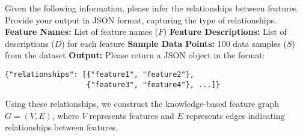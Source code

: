 \begin{tcolorbox}[
    sharp corners=south,
    colback=white!98!black,
    colframe=white!45!black,
    boxrule=0.5mm,
    width=0.48\textwidth,
    enlarge left by=0mm,
    enlarge right by=0mm,
    arc=5mm,
    outer arc=3mm,
    fonttitle=\bfseries,
    title=Prompt for Feature Relationship Inference,
    before upper=\par\small,
    after upper=\par\small
]
\vspace*{-0.2cm}
\small
Given the following information, please infer the relationships between features. Provide your output in JSON format, capturing the type of relationships.\newline
\textbf{Feature Names:} {List of feature names ($F$)}\newline
\textbf{Feature Descriptions:} {List of descriptions ($D$) for each feature}\newline
\textbf{Sample Data Points:} {100 data samples ($S$) from the dataset}\newline
\textbf{Output:} Please return a JSON object in the format:
\begin{verbatim}
{"relationships": [{"feature1", "feature2"}, 
                   {"feature3", "feature4"}, ...]}
\end{verbatim}
\vspace*{-0.3cm}
\end{tcolorbox}




Using these relationships, we construct the knowledge-based feature graph \( G = (V, E) \), where \( V \) represents features and \( E \) represents edges indicating relationships between features.



